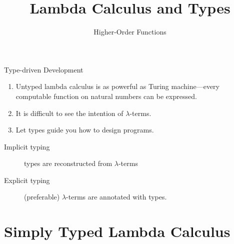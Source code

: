 \title{Lambda Calculus and Types}
\subtitle{Higher-Order Functions}

\begin{frame}
\maketitle
\end{frame}

\begin{frame}{Type-driven Development}

  \begin{enumerate}
    \item Untyped lambda calculus is as powerful as Turing machine---every
      computable function on natural numbers can be expressed.
    \item It is difficult to see the intention of $\lambda$-terms. 
    \item Let \alert{types} guide you how to design programs. 
  \end{enumerate}

  \begin{description}
    \item[Implicit typing]
      types are reconstructed from $\lambda$-terms 
    \item[Explicit typing] (preferable) 
    $\lambda$-terms are annotated with types.
  \end{description}
\end{frame}

\section{Simply Typed Lambda Calculus}
